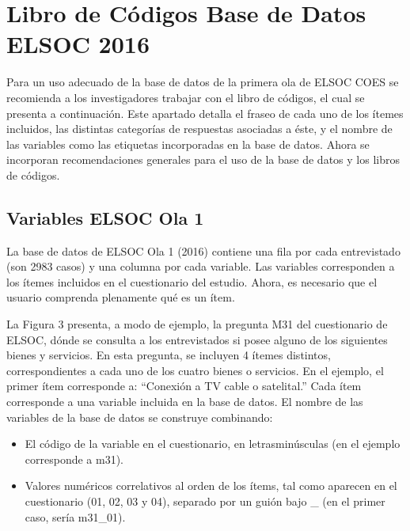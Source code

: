 \documentclass[
]{book}
\providecommand{\tightlist}{%
  \setlength{\itemsep}{0pt}\setlength{\parskip}{0pt}}
\begin{document}
\hypertarget{libro-de-cuxf3digos-base-de-datos-elsoc-2016}{%
\chapter{Libro de Códigos Base de Datos ELSOC 2016}\label{libro-de-cuxf3digos-base-de-datos-elsoc-2016}}

Para un uso adecuado de la base de datos de la primera ola de ELSOC COES se recomienda a los investigadores trabajar con el libro de códigos, el cual se presenta a continuación. Este apartado detalla el fraseo de cada uno de los ítemes incluidos, las distintas categorías de respuestas asociadas a éste, y el nombre de las variables como las etiquetas incorporadas en la base de datos. Ahora se incorporan recomendaciones generales para el uso de la base de datos y los libros de códigos.

\hypertarget{variables-elsoc-ola-1}{%
\section{Variables ELSOC Ola 1}\label{variables-elsoc-ola-1}}

La base de datos de ELSOC Ola 1 (2016) contiene una fila por cada entrevistado (son 2983 casos) y una columna por cada variable. Las variables corresponden a los ítemes incluidos en el cuestionario del estudio. Ahora, es necesario que el usuario comprenda plenamente qué es un ítem.

La Figura 3 presenta, a modo de ejemplo, la pregunta M31 del cuestionario de ELSOC, dónde se consulta a los entrevistados si posee alguno de los siguientes bienes y servicios. En esta pregunta, se incluyen 4 ítemes distintos, correspondientes a cada uno de los cuatro bienes o servicios. En el ejemplo, el primer ítem corresponde a: ``Conexión a TV cable o satelital.'' Cada ítem corresponde a una variable incluida en la base de datos. El nombre de las variables de la base de datos se construye combinando:

\begin{itemize}
\tightlist
\item
  El código de la variable en el cuestionario, en letrasminúsculas (en el ejemplo corresponde
  a m31).
\item
  Valores numéricos correlativos al orden de los ítems, tal como aparecen en el cuestionario
  (01, 02, 03 y 04), separado por un guión bajo \_ (en el primer caso, sería m31\_01).
\end{itemize}
\end{document}
